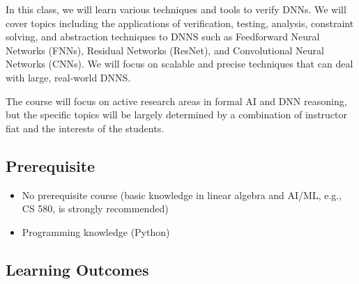 \documentclass[11pt]{article}
\begin{document}
In this class, we will learn various techniques and tools to verify DNNs. We will cover topics including the applications
of verification, testing, analysis, constraint solving, and abstraction
techniques to DNNS such as Feedforward Neural Networks
(FNNs), Residual Networks (ResNet), and Convolutional Neural Networks
(CNNs). We will focus on scalable and precise techniques that can deal with large, real-world DNNS.

The course will focus on active research areas in formal AI and DNN reasoning,
but the specific topics will be largely determined by a
combination of instructor fiat and the interests of the students.



\subsection{Prerequisite}
\begin{itemize}
\item No prerequisite course (basic knowledge in linear algebra and AI/ML, e.g., CS 580, is strongly recommended)
\item Programming knowledge (Python)
\end{itemize}



\subsection{Learning Outcomes}
\end{document}
